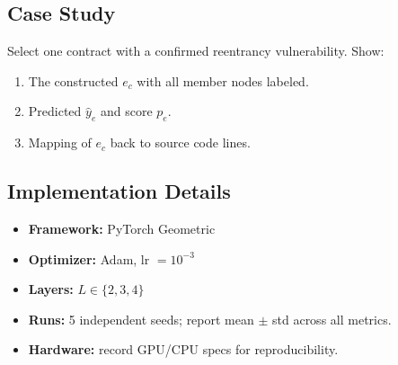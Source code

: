 \documentclass[11pt]{article}
\begin{document}
\subsection{Case Study}

Select one contract with a confirmed reentrancy vulnerability. Show:
\begin{enumerate}
    \item The constructed $e_c$ with all member nodes labeled.
    \item Predicted $\hat{y}_e$ and score $p_e$.
    \item Mapping of $e_c$ back to source code lines.
\end{enumerate}

\subsection{Implementation Details}

\begin{itemize}
    \item \textbf{Framework:} PyTorch Geometric
    \item \textbf{Optimizer:} Adam, lr $= 10^{-3}$
    \item \textbf{Layers:} $L \in \{2, 3, 4\}$
    \item \textbf{Runs:} 5 independent seeds; report mean $\pm$ std across all metrics.
    \item \textbf{Hardware:} record GPU/CPU specs for reproducibility.
\end{itemize}
\end{document}
